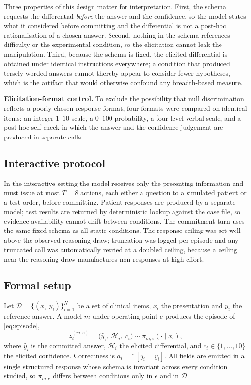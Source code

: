 \documentclass[journal,twoside]{IEEEtran}
\begin{document}
Three properties of this design matter for interpretation. First, the schema requests the
differential \emph{before} the answer and the confidence, so the model states what it considered
before committing and the differential is not a post-hoc rationalisation of a chosen answer. Second,
nothing in the schema references difficulty or the experimental condition, so the elicitation cannot leak the manipulation. Third, because the
schema is fixed, the elicited differential is obtained under identical instructions everywhere; a
condition that produced tersely worded answers cannot thereby appear to consider fewer hypotheses,
which is the artifact that would otherwise confound any breadth-based measure.

\textbf{Elicitation-format control.} To exclude the possibility that null discrimination reflects a
poorly chosen response format, four formats were compared on identical items: an integer $1$--$10$
scale, a $0$--$100$ probability, a four-level verbal scale, and a post-hoc self-check in which the
answer and the confidence judgement are produced in separate calls.

\subsection{Interactive protocol}
In the interactive setting the model receives only the presenting information and must issue at most
$T=8$ actions, each either a question to a simulated patient or a test order, before committing.
Patient responses are produced by a separate model; test results are returned by deterministic lookup
against the case file, so evidence availability cannot drift between conditions. The commitment turn
uses the same fixed schema as all static conditions. The response ceiling was set well above the
observed reasoning draw; truncation was logged per episode and any truncated call was automatically
retried at a doubled ceiling, because a ceiling near the reasoning draw manufactures non-responses at
high effort.

\subsection{Formal setup}
Let $\mathcal{D}=\{(x_i,y_i)\}_{i=1}^{N}$ be a set of clinical items, $x_i$ the presentation and
$y_i$ the reference answer. A model $m$ under operating point $e$ produces the episode of \eqref{eq:episode},
\begin{equation}
z_i^{(m,e)} = \big(\hat{y}_i,\; \mathcal{H}_i,\; c_i\big) \sim \pi_{m,e}(\cdot \mid x_i),
\label{eq:episode}
\end{equation}
where $\hat{y}_i$ is the committed answer, $\mathcal{H}_i$ the elicited differential, and
$c_i\in\{1,\dots,10\}$ the elicited confidence. Correctness is $a_i=\mathbb{1}[\hat{y}_i = y_i]$.
All fields are emitted in a single
structured response whose schema is invariant across every condition studied, so $\pi_{m,e}$ differs
between conditions only in $e$ and in $\mathcal{D}$.
\end{document}
